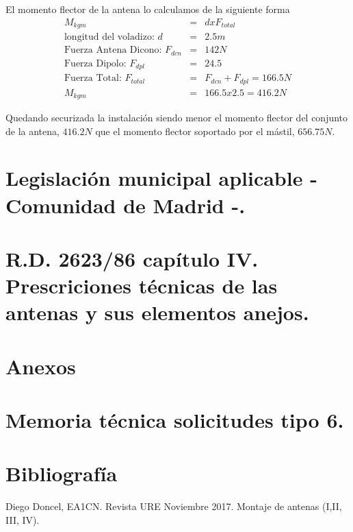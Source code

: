 \documentclass[letterpaper, 10pt]{article} %
\begin{document}
El momento flector de la antena lo calculamos de la siguiente forma
\begin{eqnarray}
M_{kgm} &=& d x F_{total}  \\
\text{longitud del voladizo: } d & = & 2.5m \\
\text{Fuerza Antena Dicono: } F_{dcn} &=& 142N \\
\text{Fuerza Dipolo: } F_{dpl} &=& 24.5 \\
\text{Fuerza Total: } F_{total} &=& F_{dcn} + F_{dpl} = 166.5N \\
M_{kgm} &=& 166.5 x 2.5 = 416.2N
\end{eqnarray}

Quedando securizada la instalación siendo menor el momento flector del conjunto de la antena, $416.2N$ que el momento flector soportado por el mástil, $656.75N$.

\newpage

\section{Legislación municipal aplicable - Comunidad de Madrid -.}

\newpage

\section{R.D. 2623/86 capítulo IV. Prescriciones técnicas de las antenas y sus elementos anejos.}

\newpage

\section{Anexos}



\newpage

\section{Memoria técnica solicitudes tipo 6.}
\newpage

\section{Bibliografía}
\begin{thebibliography}{0}
	 Diego Doncel, EA1CN. Revista URE Noviembre 2017. Montaje de antenas (I,II, III, IV).
\end{thebibliography}
\end{document}

